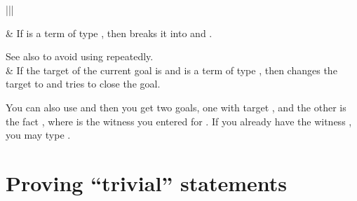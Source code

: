 \documentclass[letterpaper,10pt,english]{sphinxmanual}
\begin{document}
\begin{savenotes}\sphinxattablestart
\centering
\begin{tabular}[t]{|||}
\hline

\sphinxAtStartPar
{}
&
\sphinxAtStartPar
If  is a term of type , then
 breaks it into
 and .

\sphinxAtStartPar
See also  to avoid using  repeatedly.
\\
\hline
\sphinxAtStartPar
{}
&
\sphinxAtStartPar
If the target of the current goal is 
and  is a term of type , then
 changes the target to  and tries to close the goal.

\sphinxAtStartPar
You can also use  and then you get two goals, one with target , and the other is the fact ,
where  is the witness you entered for .
If you already have the witness , you may type .
\\
\hline
\end{tabular}
\par
\sphinxattableend\end{savenotes}


\section{Proving “trivial” statements}
\label{\detokenize{tactics:proving-trivial-statements}}
\end{document}
